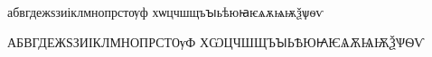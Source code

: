 \documentclass{article}
\begin{document}
	\raggedright
	абвгдежѕзиіклмнопрстѹф%
	хѡцчшщъꙑьѣюꙗѥѧѫѩѭѯѱѳѵ
	
	\uppercase{абвгдежѕзиіклмнопрстѹф
		хѡцчшщъꙑьѣюꙗѥѧѫѩѭѯѱѳѵ}
	
	
	
\end{document}
